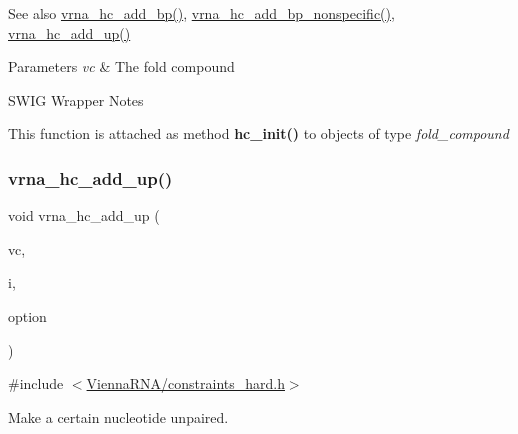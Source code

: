 \begin{DoxySeeAlso}{See also}
\hyperlink{group__hard__constraints_ga7cba95ebe2ceb5ec9a5768f2232854fd}{vrna\+\_\+hc\+\_\+add\+\_\+bp()}, \hyperlink{group__hard__constraints_gaed50398ade2d4852c9e82592fe76046c}{vrna\+\_\+hc\+\_\+add\+\_\+bp\+\_\+nonspecific()}, \hyperlink{group__hard__constraints_ga447d88e06ad97bb225cd83310ace8345}{vrna\+\_\+hc\+\_\+add\+\_\+up()}
\end{DoxySeeAlso}

\begin{DoxyParams}{Parameters}
{\em vc} & The fold compound\\
\hline
\end{DoxyParams}
\begin{DoxyRefDesc}{S\+W\+I\+G Wrapper Notes}
\item[\hyperlink{wrappers__wrappers000006}{S\+W\+I\+G Wrapper Notes}]This function is attached as method {\bfseries hc\+\_\+init()} to objects of type {\itshape fold\+\_\+compound} \end{DoxyRefDesc}
\mbox{\label{group__hard__constraints_ga447d88e06ad97bb225cd83310ace8345}} 
\subsubsection{\texorpdfstring{vrna\+\_\+hc\+\_\+add\+\_\+up()}{vrna\_hc\_add\_up()}}
{\footnotesize\ttfamily void vrna\+\_\+hc\+\_\+add\+\_\+up (\begin{DoxyParamCaption}\item[{\hyperlink{group__fold__compound_ga1b0cef17fd40466cef5968eaeeff6166}{vrna\+\_\+fold\+\_\+compound\+\_\+t} $\ast$}]{vc,  }\item[{int}]{i,  }\item[{unsigned char}]{option }\end{DoxyParamCaption})}



{\ttfamily \#include $<$\hyperlink{constraints__hard_8h}{Vienna\+R\+N\+A/constraints\+\_\+hard.\+h}$>$}



Make a certain nucleotide unpaired. 

